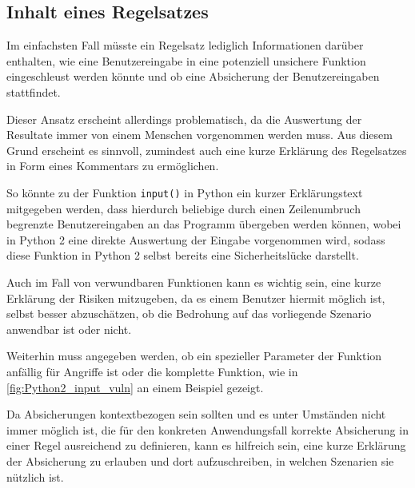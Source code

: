         \subsection{Inhalt eines Regelsatzes}\label{Inhalt eines Regelsatzes}
            Im einfachsten Fall müsste ein Regelsatz lediglich Informationen darüber enthalten,
            wie eine Benutzereingabe in eine potenziell unsichere Funktion eingeschleust werden könnte und
            ob eine Absicherung der Benutzereingaben stattfindet.

            Dieser Ansatz erscheint allerdings problematisch,
            da die Auswertung der Resultate immer von einem Menschen vorgenommen werden muss.
            Aus diesem Grund erscheint es sinnvoll,
            zumindest auch eine kurze Erklärung des Regelsatzes in Form eines Kommentars zu ermöglichen.

            So könnte zu der Funktion
            \lstinline{input()} in Python ein kurzer Erklärungstext mitgegeben werden,
            dass hierdurch beliebige durch einen Zeilenumbruch begrenzte Benutzereingaben an das Programm übergeben werden können,
            wobei in Python 2 eine direkte Auswertung der Eingabe vorgenommen wird,
            sodass diese Funktion in Python 2 selbst bereits eine Sicherheitslücke darstellt.\cite{Rossum2018}

            Auch im Fall von verwundbaren Funktionen kann es wichtig sein,
            eine kurze Erklärung der Risiken mitzugeben,
            da es einem Benutzer hiermit möglich ist,
            selbst besser abzuschätzen,
            ob die Bedrohung auf das vorliegende Szenario anwendbar ist oder
            nicht.

            Weiterhin muss angegeben werden,
            ob ein spezieller Parameter der Funktion anfällig für Angriffe ist oder
            die komplette Funktion,
            wie in
            \vref{fig:Python2_input_vuln} an einem Beispiel gezeigt.

            Da Absicherungen kontextbezogen sein sollten und
            es unter Umständen nicht immer möglich ist,
            die für den konkreten Anwendungsfall korrekte Absicherung in einer Regel ausreichend zu definieren,
            kann es hilfreich sein,
            eine kurze Erklärung der Absicherung zu erlauben und
            dort aufzuschreiben,
            in welchen Szenarien sie nützlich ist.

